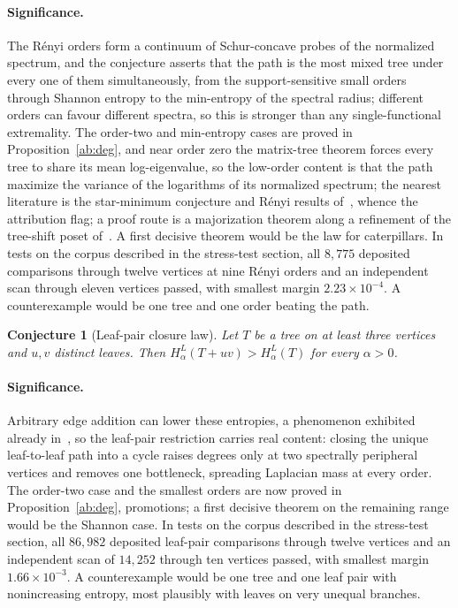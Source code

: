 \documentclass[11pt]{article}
\newtheorem{conjecture}{Conjecture}
\theoremstyle{definition}
\begin{document}
\paragraph{Significance.}
The R\'enyi orders form a continuum of Schur-concave probes of the normalized spectrum, and the conjecture asserts that the path is the most mixed tree under every one of them simultaneously, from the support-sensitive small orders through Shannon entropy to the min-entropy of the spectral radius; different orders can favour different spectra, so this is stronger than any single-functional extremality.  The order-two and min-entropy cases are proved in Proposition~\ref{ab:deg}, and near order zero the matrix-tree theorem forces every tree to share its mean log-eigenvalue, so the low-order content is that the path maximize the variance of the logarithms of its normalized spectrum; the nearest literature is the star-minimum conjecture and R\'enyi results of~\cite{DHL17}, whence the attribution flag; a proof route is a majorization theorem along a refinement of the tree-shift poset of~\cite{Csi13}.  A first decisive theorem would be the law for caterpillars.  In tests on the corpus described in the stress-test section, all $8{,}775$ deposited comparisons through twelve vertices at nine R\'enyi orders and an independent scan through eleven vertices passed, with smallest margin $2.23\times10^{-4}$.  A counterexample would be one tree and one order beating the path.

\begin{conjecture}[Leaf-pair closure law]\label{ab2}
Let $T$ be a tree on at least three vertices and $u,v$ distinct leaves.  Then $H^L_\alpha(T+uv)>H^L_\alpha(T)$ for every $\alpha>0$.
\end{conjecture}

\paragraph{Significance.}
Arbitrary edge addition can lower these entropies, a phenomenon exhibited already in~\cite{DHL17}, so the leaf-pair restriction carries real content: closing the unique leaf-to-leaf path into a cycle raises degrees only at two spectrally peripheral vertices and removes one bottleneck, spreading Laplacian mass at every order.  The order-two case and the smallest orders are now proved in Proposition~\ref{ab:deg}, promotions; a first decisive theorem on the remaining range would be the Shannon case.  In tests on the corpus described in the stress-test section, all $86{,}982$ deposited leaf-pair comparisons through twelve vertices and an independent scan of $14{,}252$ through ten vertices passed, with smallest margin $1.66\times10^{-3}$.  A counterexample would be one tree and one leaf pair with nonincreasing entropy, most plausibly with leaves on very unequal branches.
\end{document}
